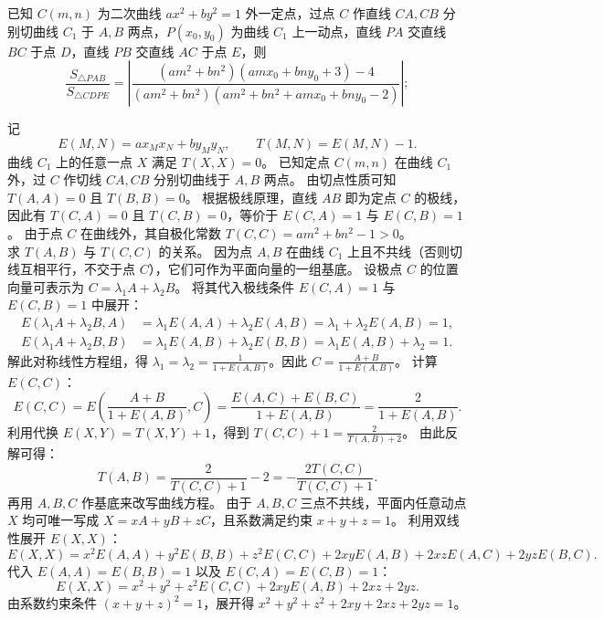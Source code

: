 


\begin{example}
已知 \(C(m,n)\) 为二次曲线 \(ax^2 + by^2 = 1\) 外一定点，过点 \(C\) 作直线 \(CA,CB\) 分别切曲线 \(C_1\) 于 \(A,B\) 两点，\(P(x_0,y_0)\) 为曲线 \(C_1\) 上一动点，直线 \(PA\) 交直线 \(BC\) 于点 \(D\)，直线 \(PB\) 交直线 \(AC\) 于点 \(E\)，则
\[
\frac{S_{\triangle PAB}}{S_{\triangle CDPE}} = \left|
\frac{
(am^2 + bn^2)(amx_0 + bny_0 + 3) - 4
}{
(am^2 + bn^2)(am^2 + bn^2 + amx_0 + bny_0 - 2)
}
\right|;
\]
\end{example}
\begin{solution}
记
\[ E(M, N) = a x_M x_N + b y_M y_N,\qquad T(M, N) = E(M, N) - 1. \]
曲线 $C_1$ 上的任意一点 $X$ 满足 $T(X, X) = 0$。
已知定点 $C(m,n)$ 在曲线 $C_1$ 外，过 $C$ 作切线 $CA, CB$ 分别切曲线于 $A, B$ 两点。
由切点性质可知 $T(A, A) = 0$ 且 $T(B, B) = 0$。
根据极线原理，直线 $AB$ 即为定点 $C$ 的极线，因此有 $T(C, A) = 0$ 且 $T(C, B) = 0$，等价于 $E(C, A) = 1$ 与 $E(C, B) = 1$。
由于点 $C$ 在曲线外，其自极化常数 $T(C, C) = am^2+bn^2-1 > 0$。\\
求 $T(A,B)$ 与 $T(C,C)$ 的关系。
因为点 $A, B$ 在曲线 $C_1$ 上且不共线（否则切线互相平行，不交于点 $C$），它们可作为平面向量的一组基底。
设极点 $C$ 的位置向量可表示为 $C = \lambda_1 A + \lambda_2 B$。
将其代入极线条件 $E(C, A) = 1$ 与 $E(C, B) = 1$ 中展开：
\begin{align*}
E(\lambda_1 A + \lambda_2 B, A) &= \lambda_1 E(A, A) + \lambda_2 E(A, B) = \lambda_1 + \lambda_2 E(A, B) = 1, \\
E(\lambda_1 A + \lambda_2 B, B) &= \lambda_1 E(A, B) + \lambda_2 E(B, B) = \lambda_1 E(A, B) + \lambda_2 = 1.
\end{align*}
解此对称线性方程组，得 $\lambda_1 = \lambda_2 = \frac{1}{1+E(A, B)}$。因此 $C = \frac{A+B}{1+E(A, B)}$。
计算 $E(C, C)$：
\[ E(C, C) = E\left( \frac{A+B}{1+E(A, B)}, C \right) = \frac{E(A, C) + E(B, C)}{1+E(A, B)} = \frac{2}{1+E(A, B)}. \]
利用代换 $E(X, Y) = T(X, Y) + 1$，得到 $T(C, C) + 1 = \frac{2}{T(A, B) + 2}$。
由此反解可得：
\[ T(A, B) = \frac{2}{T(C, C) + 1} - 2 = -\frac{2T(C, C)}{T(C, C) + 1}. \]
再用 $A,B,C$ 作基底来改写曲线方程。
由于 $A, B, C$ 三点不共线，平面内任意动点 $X$ 均可唯一写成 $X = xA + yB + zC$，且系数满足约束 $x + y + z = 1$。
利用双线性展开 $E(X, X)$：
\[ E(X, X) = x^2 E(A, A) + y^2 E(B, B) + z^2 E(C, C) + 2xy E(A, B) + 2xz E(A, C) + 2yz E(B, C). \]
代入 $E(A, A) = E(B, B) = 1$ 以及 $E(C, A) = E(C, B) = 1$：
\[ E(X, X) = x^2 + y^2 + z^2 E(C, C) + 2xy E(A, B) + 2xz + 2yz. \]
由系数约束条件 $(x+y+z)^2 = 1$，展开得 $x^2 + y^2 + z^2 + 2xy + 2xz + 2yz = 1$。

\end{solution}
